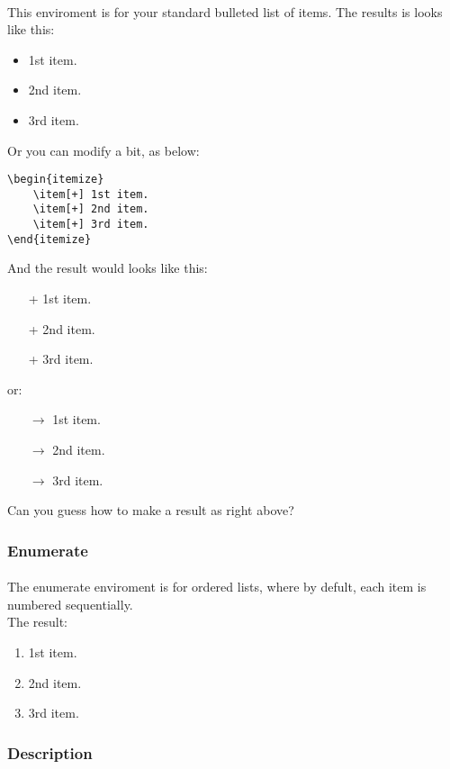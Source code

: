 \paragraph{}
This enviroment is for your standard bulleted list of items.
The results is looks like this:
\begin{itemize}
	\item 1st item.
	\item 2nd item.
	\item 3rd item.
\end{itemize}
Or you can modify a bit, as below:
\begin{verbatim}
\begin{itemize}
	\item[+] 1st item.
	\item[+] 2nd item.
	\item[+] 3rd item.
\end{itemize}
\end{verbatim}
And the result would looks like this:
\begin{itemize}
	\item[+] 1st item.
	\item[+] 2nd item.
	\item[+] 3rd item.
\end{itemize}
or:
\begin{itemize}
	\item[$\rightarrow$] 1st item.
	\item[$\rightarrow$] 2nd item.
	\item[$\rightarrow$] 3rd item.
\end{itemize}
Can you guess how to make a result as right above?

\subsubsection{Enumerate}
\paragraph{}
The enumerate enviroment is for ordered lists, where by defult,
each item is numbered sequentially.\\
The result:
\begin{enumerate}
	\item 1st item.
	\item 2nd item.
	\item 3rd item.
\end{enumerate}

\subsubsection{Description}
